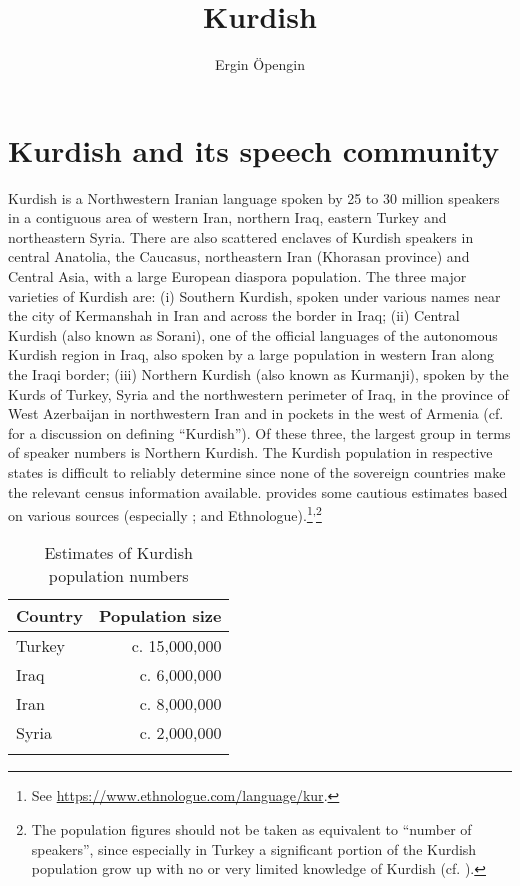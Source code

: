 \documentclass[output=paper]{langsci/langscibook}
\author{Ergin Öpengin\affiliation{University of Kurdistan-Hewlêr}}
\title{Kurdish}
\begin{document}
\maketitle

\section{Kurdish and its speech community} 

Kurdish is a Northwestern Iranian language spoken by 25 to 30 million speakers in a contiguous area of western Iran, northern Iraq, eastern Turkey and northeastern Syria. There are also scattered enclaves of Kurdish speakers in central Anatolia, the Caucasus, northeastern Iran (Khorasan province) and Central Asia, with a large European diaspora population. The three major varieties of Kurdish are: (i) Southern Kurdish, spoken under various names near the city of Kermanshah in Iran and across the border in Iraq; (ii) Central Kurdish (also known as Sorani), one of the official languages of the autonomous Kurdish region in Iraq, also spoken by a large population in western Iran along the Iraqi border; (iii) Northern Kurdish (also known as Kurmanji), spoken by the Kurds of Turkey, Syria and the northwestern perimeter of Iraq, in the province of West Azerbaijan in northwestern Iran and in pockets in the west of Armenia (cf. \citealt{HaigÖpengin2014} for a discussion on defining “Kurdish”). Of these three, the largest group in terms of speaker numbers is Northern Kurdish. The Kurdish population in respective states is difficult to reliably determine since none of the sovereign countries make the relevant census information available.  provides some cautious estimates based on various sources (especially \citealt{Sirkeci2005,ZeyneloğluEtAl2016}; and Ethnologue).\footnote{See \url{https://www.ethnologue.com/language/kur}.}\textsuperscript{,}\footnote{The population figures should not be taken as equivalent to “number of speakers”, since especially in Turkey a significant portion of the Kurdish population grow up with no or very limited knowledge of Kurdish (cf. \citealt{Öpengin2012,ZeyneloğluEtAl2016}).} 

\begin{table}
\begin{tabular}{lr}
\lsptoprule
Country & Population size\\\midrule
{Turkey} & c. 15,000,000\\
{Iraq}   & c. 6,000,000\\
{Iran}   & c. 8,000,000\\
{Syria}  & c. 2,000,000\\
\lspbottomrule
\end{tabular}
\caption{Estimates of Kurdish population numbers}
\label{tab:opengin:1}
\end{table}
\end{document}
